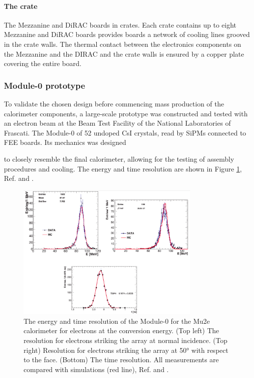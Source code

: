 \paragraph{The crate}
The Mezzanine and DiRAC boards  in crates.
Each crate contains up to eight Mezzanine 
and DiRAC boards provides  boards  a network of cooling lines grooved in the crate walls.
The thermal contact between the electronics components on the Mezzanine and the DIRAC
and the crate walls is ensured by a copper plate covering the entire board.
\subsubsection{Module-0 prototype}
To validate the chosen design before commencing  mass production of 
the calorimeter components, a large-scale prototype was constructed and 
tested with an electron beam at the Beam Test Facility of the National 
Laboratories of Frascati. The Module-0  of 52 undoped CsI crystals, 
read by { SiPMs} connected to FEE boards. Its mechanics was designed

to closely resemble the final calorimeter, allowing for the testing 
of  assembly procedures and cooling.
The energy and time resolution are
shown in Figure \ref{fig:calores}, Ref. \cite{bobbb} and \cite{calo95}.
\begin{figure}[!h]
    \centering
    \includegraphics[width =0.8\textwidth]{figures/png/Screenshot_20240330_105520.png}
    \caption[The energy and time resolution of the calorimeter Module-0.]{The 
    energy and time resolution of the Module-0 for the Mu2e 
    calorimeter for electrons at the conversion energy. (Top left) The resolution 
    for electrons striking the array at normal incidence. (Top right) 
    Resolution for electrons striking the array at 50° with respect to the 
    face. (Bottom) The time resolution. All measurements are compared with 
    simulations (red line), Ref. \cite{bobbb} and \cite{calo95}.}
    \label{fig:calores}
\end{figure}
